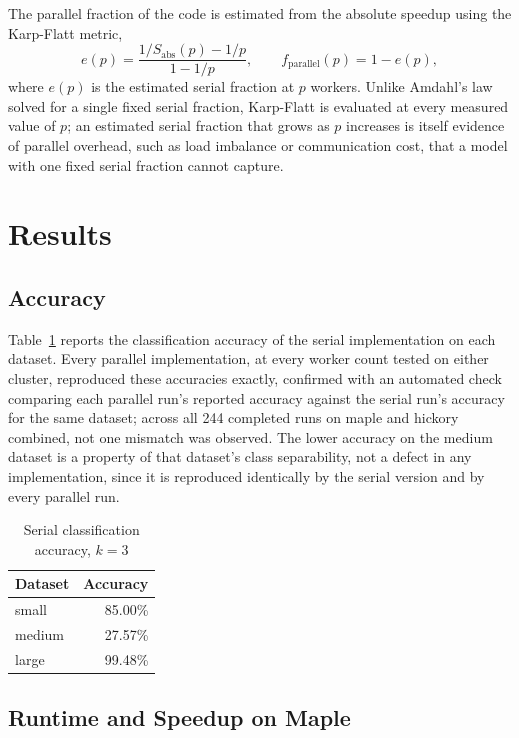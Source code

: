 \documentclass[conference]{IEEEtran}
\begin{document}
The parallel fraction of the code is estimated from the absolute speedup
using the Karp-Flatt metric,
\begin{equation}
e(p) = \frac{1/S_{\text{abs}}(p) - 1/p}{1 - 1/p}, \qquad
f_{\text{parallel}}(p) = 1 - e(p),
\label{eq:karpflatt}
\end{equation}
where $e(p)$ is the estimated serial fraction at $p$ workers. Unlike
Amdahl's law solved for a single fixed serial fraction, Karp-Flatt is
evaluated at every measured value of $p$; an estimated serial fraction that
grows as $p$ increases is itself evidence of parallel overhead, such as
load imbalance or communication cost, that a model with one fixed serial
fraction cannot capture.

\section{Results}
\label{sec:results}

\subsection{Accuracy}

Table~\ref{tab:accuracy} reports the classification accuracy of the serial
implementation on each dataset. Every parallel implementation, at every
worker count tested on either cluster, reproduced these accuracies exactly,
confirmed with an automated check comparing each parallel run's reported
accuracy against the serial run's accuracy for the same dataset; across all
244 completed runs on maple and hickory combined, not one mismatch was
observed. The lower accuracy on the medium dataset is a property of that
dataset's class separability, not a defect in any implementation, since it
is reproduced identically by the serial version and by every parallel run.

\begin{table}[htbp]
\caption{Serial classification accuracy, $k=3$}
\label{tab:accuracy}
\centering
\begin{tabular}{lr}
\toprule
Dataset & Accuracy \\
\midrule
small  & 85.00\% \\
medium & 27.57\% \\
large  & 99.48\% \\
\bottomrule
\end{tabular}
\end{table}

\subsection{Runtime and Speedup on Maple}
\end{document}
